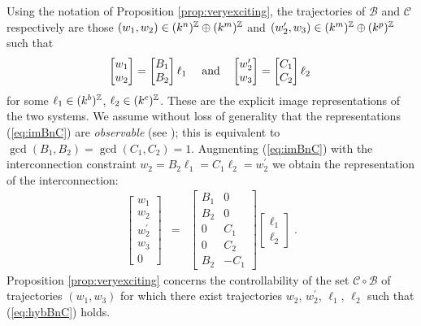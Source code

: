 Using the notation of Proposition \ref{prop:veryexciting}, the trajectories of
$\mathscr{B}$ and $\mathscr{C}$ respectively are those $(w_1,w_2) \in (k^n)^{\mathbb Z}
\oplus (k^m)^{\mathbb Z}$ and $(w_2',w_3) \in (k^m)^{\mathbb Z} \oplus (k^p)^{\mathbb Z}$ such that 
\begin{equation}\label{eq:imBnC}
\begin{bmatrix} w_1\\w_2 \end{bmatrix}
=
\begin{bmatrix} B_1\\B_2 \end{bmatrix} \ell_1 
\quad \mbox{ \rm and} \quad  
\begin{bmatrix} w_2^\prime\\w_3 \end{bmatrix}
=
\begin{bmatrix} C_1\\C_2 \end{bmatrix} \ell_2\; 
\end{equation}
for some $\ell_1 \in (k^b)^{\mathbb Z}$, $\ell_2 \in (k^c)^{\mathbb Z}$. These are the explicit
image representations of the two systems.  We assume without loss
of generality that the representations (\ref{eq:imBnC}) are \emph{observable}
(see \cite{Wi}); this is equivalent to $\gcd(B_1,B_2)=\gcd(C_1,C_2)=1$. Augmenting
(\ref{eq:imBnC}) with the interconnection constraint
$w_2=B_2\ell_1=C_1\ell_2=w_2^\prime$ we obtain the representation of the
interconnection: 
\begin{eqnarray}\label{eq:hybBnC}
\begin{bmatrix}
w_1\\w_2\\w_2^\prime\\w_3\\0
\end{bmatrix}&=&\begin{bmatrix} B_1&0\\B_2&0\\0&C_1\\ 0&C_2 \\ B_2&-C_1 \end{bmatrix} \begin{bmatrix} \ell_1\\\ell_2\end{bmatrix}\; .
\end{eqnarray}
Proposition \ref{prop:veryexciting} concerns the controllability of the set
$\mathscr{C} \circ \mathscr{B}$ of trajectories $(w_1,w_3)$ for which there
exist trajectories $w_2$, $w_2^\prime$, $\ell_1$, $\ell_2$ such that
(\ref{eq:hybBnC}) holds. 

